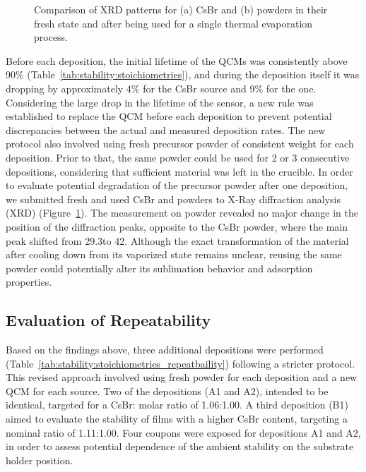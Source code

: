 \begin{figure}[htbp]
    \caption[Comparison of XRD patterns for precursor powders in their fresh state and after being used for a single thermal evaporation process.]{Comparison of XRD patterns for (a) CsBr and (b)  powders in their fresh state and after being used for a single thermal evaporation process.}   
    \label{fig:stability:fresh_used_powders}
\end{figure}

Before each deposition, the initial lifetime of the QCMs was consistently above 90\% (Table~\ref{tab:stability:stoichiometries}), and during the deposition itself it was dropping by approximately 4\% for the CsBr source and 9\% for the  one. Considering the large drop in the lifetime of the  sensor, a new rule was established to replace the QCM before each deposition to prevent potential discrepancies between the actual and measured deposition rates. The new protocol also involved using fresh precursor powder of consistent weight for each deposition. Prior to that, the same powder could be used for 2 or 3 consecutive depositions, considering that sufficient material was left in the crucible. In order to evaluate potential degradation of the precursor powder after one deposition, we submitted fresh and used CsBr and  powders to X-Ray diffraction analysis (XRD)  (Figure~\ref{fig:stability:fresh_used_powders}). The measurement on  powder revealed no major change in the position of the diffraction peaks, opposite to the CsBr powder, where the main peak shifted from 29.3\degree to 42\degree. Although the exact transformation of the material after cooling down from its vaporized state remains unclear, reusing the same powder could potentially alter its sublimation behavior and adsorption properties.


\subsection{Evaluation of Repeatability}

Based on the findings above, three additional depositions were performed (Table~\ref{tab:stability:stoichiometries_repeatbaility}) following a stricter protocol. This revised approach involved using fresh powder for each deposition and a new QCM for each source. Two of the depositions (A1 and A2), intended to be identical, targeted for a CsBr: molar ratio of 1.06:1.00. A third deposition (B1) aimed to evaluate the stability of films with a higher CsBr content, targeting a nominal ratio of 1.11:1.00. Four coupons were exposed for depositions A1 and A2, in order to assess potential dependence of the ambient stability on the substrate holder position.


